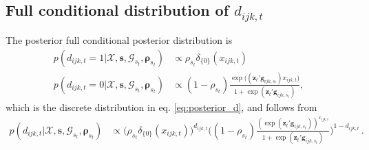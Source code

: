 \documentclass[12pt,a4paper]{article}
\theoremstyle{custom}
\begin{document}
\subsection{Full conditional distribution of $d_{ijk,t}$} \label{sec:posterior_d_ijkt}
The posterior full conditional posterior distribution is
\begin{align*}
p(d_{ijk,t} = 1|\boldsymbol{\mathcal{X}},\mathbf{s},\mathcal{G}_{s_t},\boldsymbol{\rho}_{s_t}) & \propto \rho_{s_t} \delta_{\lbrace 0 \rbrace}(x_{ijk,t}) \\
p(d_{ijk,t} = 0|\boldsymbol{\mathcal{X}},\mathbf{s},\mathcal{G}_{s_t},\boldsymbol{\rho}_{s_t}) & \propto (1-\rho_{s_t}) \frac{\exp \big( (\mathbf{z}_t' \mathbf{g}_{ijk,s_t})x_{ijk,t} \big)}{1+\exp( \mathbf{z}_t' \mathbf{g}_{ijk,s_t} )},
\end{align*}
which is the discrete distribution in eq. \eqref{eq:posterior_d}, and follows from
\begin{align*}
p(d_{ijk,t}|\boldsymbol{\mathcal{X}},\mathbf{s},\mathcal{G}_{s_t},\boldsymbol{\rho}_{s_t}) & \propto \big(\rho_{s_t} \delta_{\lbrace 0 \rbrace}(x_{ijk,t}) \big)^{d_{ijk,t}} \Bigg( (1-\rho_{s_t}) \frac{(\exp( \mathbf{z}_t' \mathbf{g}_{ijk,s_t} ))^{x_{ijk,t}}}{1+\exp( \mathbf{z}_t' \mathbf{g}_{ijk,s_t} )} \Bigg)^{1-d_{ijk,t}} \, .
\end{align*}
\end{document}
